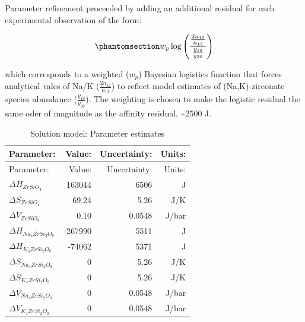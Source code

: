 \documentclass[
]{agujournal2019}
\begin{document}
Parameter refinement proceeded by adding an additional residual for each
experimental observation of the form:

\begin{equation}\phantomsection\label{eq-8}{
w_p \log \left( \frac{ \frac{2 n_{12}}{n_{13}} }{ \frac{y_{19}}{y_{20}} } \right)
}\end{equation}

which corresponds to a weighted (\(w_p\)) Bayesian logistics function
that forces analytical vales of Na/K (\(\frac{2 n_{12}}{n_{13}}\)) to
reflect model estimates of (Na,K)-zirconate species abundance
(\(\frac{y_{19}}{y_{20}}\)). The weighting is chosen to make the
logistic residual the same oder of magnitude as the affinity residual,
\textasciitilde2500 J.

\begin{longtable}[]{@{}lrrr@{}}
\caption{Solution model: Parameter
estimates}\label{tbl-2}\tabularnewline
\toprule\noalign{}
Parameter: & Value: & Uncertainty: & Units: \\
\midrule\noalign{}
\endfirsthead
\toprule\noalign{}
Parameter: & Value: & Uncertainty: & Units: \\
\midrule\noalign{}
\endhead
\bottomrule\noalign{}
\endlastfoot
\(\Delta H_{ZrSiO_4}\) & 163044 & 6506 & J \\
\(\Delta S_{ZrSiO_4}\) & 69.24 & 5.26 & J/K \\
\(\Delta V_{ZrSiO_4}\) & 0.10 & 0.0548 & J/bar \\
\(\Delta H_{Na_4ZrSi_2O_8}\) & -267990 & 5511 & J \\
\(\Delta H_{K_4ZrSi_2O_8}\) & -74062 & 5371 & J \\
\(\Delta S_{Na_4ZrSi_2O_8}\) & 0 & 5.26 & J/K \\
\(\Delta S_{K_4ZrSi_2O_8}\) & 0 & 5.26 & J/K \\
\(\Delta V_{Na_4ZrSi_2O_8}\) & 0 & 0.0548 & J/bar \\
\(\Delta V_{K_4ZrSi_2O_8}\) & 0 & 0.0548 & J/bar \\
\end{longtable}
\end{document}
